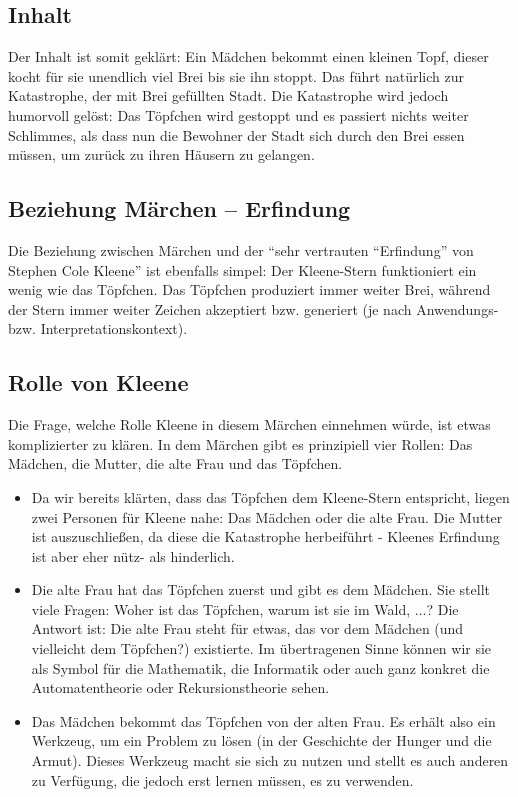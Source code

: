 \documentclass{article}
\begin{document}
\subsection*{Inhalt}
Der Inhalt ist somit geklärt: Ein Mädchen bekommt einen kleinen Topf, dieser kocht für sie unendlich viel Brei bis sie ihn stoppt. Das führt natürlich zur Katastrophe, der mit Brei gefüllten Stadt. Die Katastrophe wird jedoch humorvoll gelöst: Das Töpfchen wird gestoppt und es passiert nichts weiter Schlimmes, als dass nun die Bewohner der Stadt sich durch den Brei essen müssen, um zurück zu ihren Häusern zu gelangen.

\subsection*{Beziehung Märchen -- Erfindung}
Die Beziehung zwischen Märchen und der "`sehr vertrauten "`Erfindung"' von Stephen Cole Kleene"' ist ebenfalls simpel: 
Der Kleene-Stern funktioniert ein wenig wie das Töpfchen. Das Töpfchen produziert immer weiter Brei, während der Stern immer weiter Zeichen akzeptiert bzw. generiert (je nach Anwendungs- bzw. Interpretationskontext). 

\subsection*{Rolle von Kleene}
Die Frage, welche Rolle Kleene in diesem Märchen einnehmen würde, ist etwas komplizierter zu klären. In dem Märchen gibt es prinzipiell vier Rollen: Das Mädchen, die Mutter, die alte Frau und das Töpfchen. 
\begin{itemize}
	\item Da wir bereits klärten, dass das Töpfchen dem Kleene-Stern entspricht, liegen zwei Personen für Kleene nahe: Das Mädchen oder die alte Frau. Die Mutter ist auszuschließen, da diese die Katastrophe herbeiführt - Kleenes Erfindung ist aber eher nütz- als hinderlich.
  \item Die alte Frau hat das Töpfchen zuerst und gibt es dem Mädchen. Sie stellt viele Fragen: Woher ist das Töpfchen, warum ist sie im Wald, ...? Die Antwort ist: Die alte Frau steht für etwas, das vor dem Mädchen (und vielleicht dem Töpfchen?) existierte. Im übertragenen Sinne können wir sie als Symbol für die Mathematik, die Informatik oder auch ganz konkret die Automatentheorie oder Rekursionstheorie sehen. 
  \item Das Mädchen bekommt das Töpfchen von der alten Frau. Es erhält also ein Werkzeug, um ein Problem zu lösen (in der Geschichte der Hunger und die Armut). Dieses Werkzeug macht sie sich zu nutzen und stellt es auch anderen zu Verfügung, die jedoch erst lernen müssen, es zu verwenden. 
\end{itemize}
\end{document}
